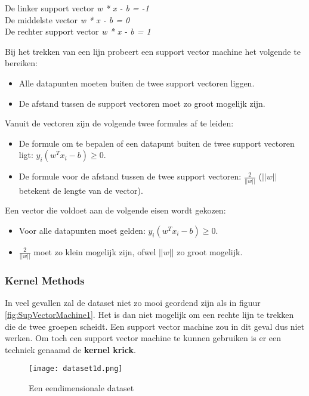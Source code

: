 \begin{center}
De linker support vector	\textit{w * x - b = -1}
\\De middelste vector			\textit{w * x - b = 0}
\\De rechter support vector 	\textit{w * x - b = 1}
\end{center}

Bij het trekken van een lijn probeert een support vector machine het volgende te bereiken:

\begin{itemize}
\item Alle datapunten moeten buiten de twee support vectoren liggen.
\item De afstand tussen de support vectoren moet zo groot mogelijk zijn.
\end{itemize}

Vanuit de vectoren zijn de volgende twee formules af te leiden:

\begin{itemize}
\item De formule om te bepalen of een datapunt buiten de twee support vectoren ligt: $y_{i}(w^{T}x_{i} - b) \geq 0 $.
\item De formule voor de afstand tussen de twee support vectoren: $\frac{2}{||w||}$ ($||w||$ betekent de lengte van de vector).
\end{itemize} 


Een vector die voldoet aan de volgende eisen wordt gekozen:
\begin{itemize}
\item Voor alle datapunten moet gelden: $y_{i}(w^{T}x_{i} - b) \geq 0 $.
\item $\frac{2}{||w||}$ moet zo klein mogelijk zijn, ofwel $||w||$ zo groot mogelijk.
\end{itemize}



\subsubsection{Kernel Methods}
In veel gevallen zal de dataset niet zo mooi geordend zijn als in figuur \ref{fig:SupVectorMachine1}. Het is dan niet mogelijk om een rechte lijn te trekken die de twee groepen scheidt. Een support vector machine zou in dit geval dus niet werken. Om toch een support vector machine te kunnen gebruiken is er een techniek genaamd de \textbf{kernel krick}.

\begin{figure}[H]
  \centering
    \texttt{[image: dataset1d.png]}
  \caption{Een eendimensionale dataset}
  \label{fig:SupVectorMachineKernel}
\end{figure}

